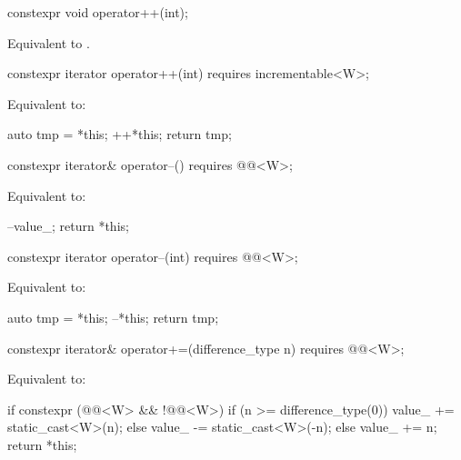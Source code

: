 \begin{itemdecl}
constexpr void operator++(int);
\end{itemdecl}

\begin{itemdescr}
\pnum
\effects
Equivalent to .
\end{itemdescr}

\begin{itemdecl}
constexpr iterator operator++(int) requires incrementable<W>;
\end{itemdecl}

\begin{itemdescr}
\pnum
\effects
Equivalent to:
\begin{codeblock}
auto tmp = *this;
++*this;
return tmp;
\end{codeblock}
\end{itemdescr}

\begin{itemdecl}
constexpr iterator& operator--() requires @@<W>;
\end{itemdecl}

\begin{itemdescr}
\pnum
\effects
Equivalent to:
\begin{codeblock}
--value_;
return *this;
\end{codeblock}
\end{itemdescr}

\begin{itemdecl}
constexpr iterator operator--(int) requires @@<W>;
\end{itemdecl}

\begin{itemdescr}
\pnum
\effects
Equivalent to:
\begin{codeblock}
auto tmp = *this;
--*this;
return tmp;
\end{codeblock}
\end{itemdescr}

\begin{itemdecl}
constexpr iterator& operator+=(difference_type n)
  requires @@<W>;
\end{itemdecl}

\begin{itemdescr}
\pnum
\effects
Equivalent to:
\begin{codeblock}
if constexpr (@@<W> && !@@<W>) {
  if (n >= difference_type(0))
    value_ += static_cast<W>(n);
  else
    value_ -= static_cast<W>(-n);
} else {
  value_ += n;
}
return *this;
\end{codeblock}
\end{itemdescr}

